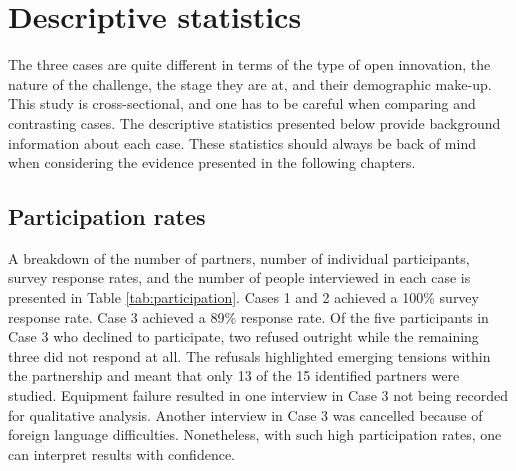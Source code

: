 \section{Descriptive statistics}

The three cases are quite different in terms of the type of open innovation, the nature of the challenge, the stage they are at, and their demographic make-up. This study is cross-sectional, and one has to be careful when comparing and contrasting cases. The descriptive statistics presented below provide background information about each case. These statistics should always be back of mind when considering the evidence presented in the following chapters.

\subsection{Participation rates}

A breakdown of the number of partners, number of individual participants, survey response rates, and the number of people interviewed in each case is presented in Table \ref{tab:participation}. Cases 1 and 2 achieved a 100\% survey response rate. Case 3 achieved a 89\% response rate. Of the five participants in Case 3 who declined to participate, two refused outright while the remaining three did not respond at all. The refusals highlighted emerging tensions within the partnership and meant that only 13 of the 15 identified partners were studied. Equipment failure resulted in one interview in Case 3 not being recorded for qualitative analysis. Another interview in Case 3 was cancelled because of foreign language difficulties. Nonetheless, with such high participation rates, one can interpret results with confidence. \medskip

\begin{table}[p]
\centering
{}
\end{table}

